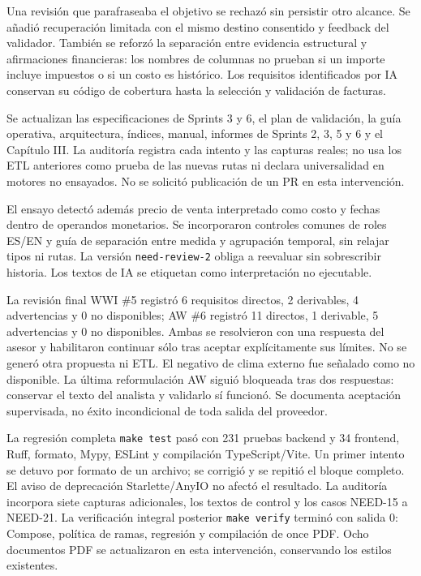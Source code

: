 \documentclass[11pt,letterpaper]{article}
\newcommand{\file}[1]{\texttt{#1}}
\begin{document}
Una revisión que parafraseaba el objetivo se rechazó sin persistir otro alcance.
Se añadió recuperación limitada con el mismo destino consentido y feedback del
validador. También se reforzó la separación entre evidencia estructural y
afirmaciones financieras: los nombres de columnas no prueban si un importe incluye
impuestos o si un costo es histórico. Los requisitos identificados por IA conservan
su código de cobertura hasta la selección y validación de facturas.

Se actualizan las especificaciones de Sprints 3 y 6, el plan de validación, la guía
operativa, arquitectura, índices, manual, informes de Sprints 2, 3, 5 y 6 y el
Capítulo III. La auditoría registra cada intento y las capturas reales; no usa los
ETL anteriores como prueba de las nuevas rutas ni declara universalidad en motores
no ensayados. No se solicitó publicación de un PR en esta intervención.

El ensayo detectó además precio de venta interpretado como costo y fechas dentro
de operandos monetarios. Se incorporaron controles comunes de roles ES/EN y guía
de separación entre medida y agrupación temporal, sin relajar tipos ni rutas.
La versión \file{need-review-2} obliga a reevaluar sin sobrescribir historia.
Los textos de IA se etiquetan como interpretación no ejecutable.

La revisión final WWI \#5 registró 6 requisitos directos, 2 derivables,
4 advertencias y 0 no disponibles; AW \#6 registró 11 directos, 1 derivable,
5 advertencias y 0 no disponibles. Ambas se resolvieron con una respuesta del
asesor y habilitaron continuar sólo tras aceptar explícitamente sus límites.
No se generó otra propuesta ni ETL. El negativo de clima externo fue señalado
como no disponible. La última reformulación AW siguió bloqueada tras dos
respuestas: conservar el texto del analista y validarlo sí funcionó. Se documenta
aceptación supervisada, no éxito incondicional de toda salida del proveedor.

La regresión completa \file{make test} pasó con 231 pruebas backend y 34 frontend,
Ruff, formato, Mypy, ESLint y compilación TypeScript/Vite. Un primer intento se
detuvo por formato de un archivo; se corrigió y se repitió el bloque completo.
El aviso de deprecación Starlette/AnyIO no afectó el resultado. La auditoría
incorpora siete capturas adicionales, los textos de control y los casos NEED-15
a NEED-21.
La verificación integral posterior \file{make verify} terminó con salida 0:
Compose, política de ramas, regresión y compilación de once PDF. Ocho documentos
PDF se actualizaron en esta intervención, conservando los estilos existentes.
\end{document}
